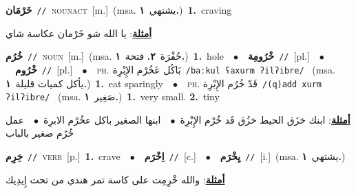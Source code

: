 \documentclass[10pt,a4paper,twoside]{article} %
\begin{document}
\begin{multicols}{2}
{\setlength\topsep{0pt}\textbf{\foreignlanguage{arabic}{خَرْمَان}}\ {\color{gray}\texttt{//}\color{black}}\ \textsc{noun\textunderscore act}\ [m.]\ \color{gray}(msa. \foreignlanguage{arabic}{يشتهي}~\foreignlanguage{arabic}{\textbf{١.}})\color{black}\ \textbf{1.}~craving\  \begin{flushright}\color{gray}\foreignlanguage{arabic}{\textbf{\underline{\foreignlanguage{arabic}{أمثلة}}}: يا الله شو خَرْمان عكاسة شاي}\end{flushright}\color{black}} \vspace{2mm}

{\setlength\topsep{0pt}\textbf{\foreignlanguage{arabic}{خُرُم}}\ {\color{gray}\texttt{//}\color{black}}\ \textsc{noun}\ [m.]\ \color{gray}(msa. \foreignlanguage{arabic}{حُفْرَة}~\foreignlanguage{arabic}{\textbf{٢.}}  \foreignlanguage{arabic}{فتحة}~\foreignlanguage{arabic}{\textbf{١.}})\color{black}\ \textbf{1.}~hole\ \ $\bullet$\ \ \setlength\topsep{0pt}\textbf{\foreignlanguage{arabic}{خْرُومِة}}\ {\color{gray}\texttt{//}\color{black}}\ [pl.]\ \ $\bullet$\ \ \setlength\topsep{0pt}\textbf{\foreignlanguage{arabic}{خْرُوم}}\ {\color{gray}\texttt{//}\color{black}}\ [pl.]\ \ $\bullet$\ \ \textsc{ph.} \color{gray} \foreignlanguage{arabic}{بَاكُل عَخُرْم الإِبْرِة}\color{black}\ {\color{gray}\texttt{/{\sffamily baːkul ʕaxurm ʔilʔibre}/}\color{black}}\ \color{gray} (msa. \foreignlanguage{arabic}{يأكل كميات قليلة}~\foreignlanguage{arabic}{\textbf{١.}})\color{black}\ \textbf{1.}~eat sparingly\ \ $\bullet$\ \ \textsc{ph.} \color{gray} \foreignlanguage{arabic}{قَدّ خُرُم الإِبْرِة}\color{black}\ {\color{gray}\texttt{/{\sffamily (q)add xurm ʔilʔibre}/}\color{black}}\ \color{gray} (msa. \foreignlanguage{arabic}{صَغِير}~\foreignlanguage{arabic}{\textbf{١.}})\color{black}\ \textbf{1.}~very small.  \textbf{2.}~tiny\  \begin{flushright}\color{gray}\foreignlanguage{arabic}{\textbf{\underline{\foreignlanguage{arabic}{أمثلة}}}: ابنك خزَق الحيط خزُق قَد خُرْم الإِبْرِة\ $\bullet$\ \  ابنها الصغير باكل عخُرْم الابرِة\ $\bullet$\ \  عمل خُرُم صغير بالباب}\end{flushright}\color{black}} \vspace{2mm}

{\setlength\topsep{0pt}\textbf{\foreignlanguage{arabic}{خِرِم}}\ {\color{gray}\texttt{//}\color{black}}\ \textsc{verb}\ [p.]\ \textbf{1.}~crave\ \ $\bullet$\ \ \setlength\topsep{0pt}\textbf{\foreignlanguage{arabic}{اِخْرَم}}\ {\color{gray}\texttt{//}\color{black}}\ [c.]\ \ $\bullet$\ \ \setlength\topsep{0pt}\textbf{\foreignlanguage{arabic}{يِخْرَم}}\ {\color{gray}\texttt{//}\color{black}}\ [i.]\ \color{gray}(msa. \foreignlanguage{arabic}{يشتهي}~\foreignlanguage{arabic}{\textbf{١.}})\color{black}\  \begin{flushright}\color{gray}\foreignlanguage{arabic}{\textbf{\underline{\foreignlanguage{arabic}{أمثلة}}}: والله خْرِمِت على كاسة تمر هندي من تحت إِيدِيك}\end{flushright}\color{black}} \vspace{2mm}


\end{multicols}
\end{document}
